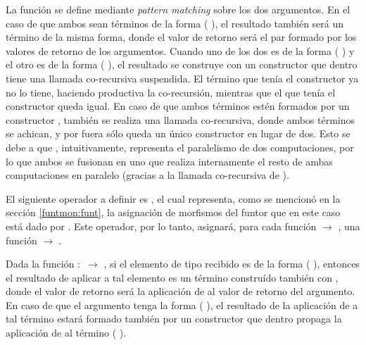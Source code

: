 La función  se define mediante \textit{pattern matching} sobre los dos argumentos. En el caso de que ambos sean términos de la forma ( ), el resultado también será un término de la misma forma, donde el valor de retorno será el par formado por los valores de retorno de los argumentos. Cuando uno de los dos es de la forma ( ) y el otro es de la forma ( ), el resultado se construye con un constructor  que dentro tiene una llamada co-recursiva suspendida. El término que tenía el constructor  ya no lo tiene, haciendo productiva la co-recursión, mientras que el que tenía el constructor  queda igual. En caso de que ambos términos estén formados por un constructor , también se realiza una llamada co-recursiva, donde ambos términos se achican, y por fuera sólo queda un único constructor  en lugar de dos. Esto se debe a que , intuitivamente, representa el paralelismo de dos computaciones, por lo que ambos  se fusionan en uno que realiza internamente el resto de ambas computaciones en paralelo (gracias a la llamada co-recursiva de ).

El siguiente operador a definir es , el cual representa, como se mencionó en la sección \ref{funtmon:funt}, la asignación de morfismos del funtor que en este caso está dado por \AgdaDatatype{$\_\bot$}. Este operador, por lo tanto, asignará, para cada función  $\rightarrow$ , una función  \AgdaDatatype{$\bot$} $\rightarrow$  \AgdaDatatype{$\bot$}. 


Dada la función  $:$  $\rightarrow$ , si el elemento de tipo  \AgdaDatatype{$\bot$} recibido es de la forma ( ), entonces el resultado de aplicar   a tal elemento es un término construído también con , donde el valor de retorno será la aplicación de  al valor de retorno del argumento. En caso de que el argumento tenga la forma ( ), el resultado de la aplicación de   a tal término estará formado también por un constructor  que dentro propaga la aplicación de   al término (\AgdaField{$\flat$} ). 

